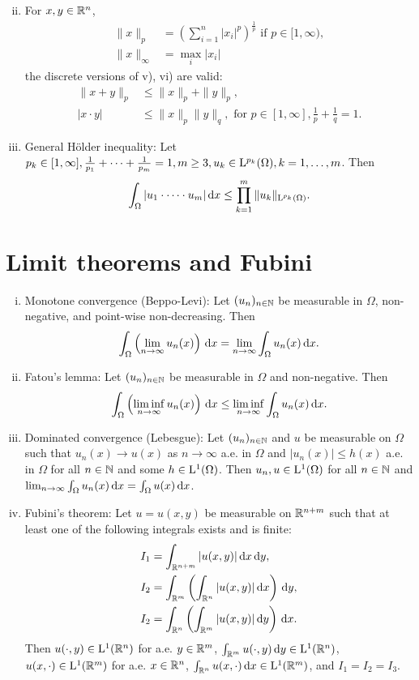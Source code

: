 \begin{enumerate}[i)]
$$    $$
  \item For $x,y \in \mathbb{R}^n$,
    \begin{align*}
      \|x\|_p &= \left( \sum_{i = 1}^n |x_i|^p  \right)^{\frac{1}{p}} \text{ if } p \in [1,\infty), \\
        \|x\|_{\infty} &= \max_{i} |x_i|
    \end{align*}
    the discrete versions of v), vi) are valid:
    \begin{align*}
      \|x + y\|_p &\leq \|x\|_p + \|y\|_p, \\
      |x \cdot y| &\leq \|x\|_p \|y\|_q, \text{ for } p \in [1, \infty], \frac{1}{p} + \frac{1}{q} =1.
    \end{align*}
  \item General Hölder inequality: Let $p_k \in [1,\infty], \frac{1}{p_1} + \cdots+ \frac{1}{p_m} = 1, m \geq 3, u_k \in \mathrm{L}^{p_k}(\Omega), k = 1,\dots,m$.
    Then
    $$
    \int_\Omega |u_1 \cdot \cdots \cdot u_m| \, {\operatorname{d}\!{x}} \leq \prod_{k = 1}^m \|u_k\|_{\mathrm{L}^{p_k}(\Omega)}.
    $$
\end{enumerate}

\section{Limit theorems and Fubini}

\begin{enumerate}[i)]
  \item Monotone convergence (Beppo-Levi): Let $(u_n)_{n \in \mathbb{N}}$ be measurable in $\Omega$, non-negative, and point-wise non-decreasing. Then
    $$
    \int_\Omega \left( \lim_{n \to \infty} u_n(x) \right) \, {\operatorname{d}\!{x}} = \lim_{n \to \infty} \int_\Omega u_n(x) \, {\operatorname{d}\!{x}}.
    $$
  \item Fatou's lemma: Let $(u_n)_{n \in \mathbb{N}}$ be measurable in $\Omega$ and non-negative. Then
    $$
    \int_\Omega \left( \liminf_{n \to \infty} u_n(x) \right) \, {\operatorname{d}\!{x}} 
    \leq \liminf_{n \to \infty} \int_\Omega u_n(x) \, {\operatorname{d}\!{x}}.
    $$
  \item Dominated convergence (Lebesgue): Let $(u_n)_{n \in \mathbb{N}}$ and $u$ be measurable on $\Omega$ such that $u_n(x) \to u(x)$ as $n \to \infty$ a.e. in $\Omega$ and $|u_n(x)| \leq h(x)$ a.e. in $\Omega$ for all $n \in \mathbb{N}$ and some $h \in \mathrm{L}^1(\Omega)$.
    Then $u_n, u \in \mathrm{L}^1(\Omega)$ for all $n \in \mathbb{N}$ and $\lim_{n \to \infty} \int_\Omega u_n(x) \, {\operatorname{d}\!{x}} = \int_\Omega u(x) \, {\operatorname{d}\!{x}}$.
  \item Fubini's theorem: Let $u = u(x,y)$ be measurable on $\mathbb{R}^{n + m}$ such that at least one of the following integrals exists and is finite:
    \begin{align*}
      I_1 &= \int_{\mathbb{R}^{n + m}} |u(x,y)| \, {\operatorname{d}\!{x}} \, {\operatorname{d}\!{y}}, \\
      I_2 &= \int_{\mathbb{R}^m} \left( \int_{\mathbb{R}^n} |u(x,y)| \, {\operatorname{d}\!{x}} \right) \, {\operatorname{d}\!{y}}, \\
      I_2 &= \int_{\mathbb{R}^n} \left( \int_{\mathbb{R}^m} |u(x,y)| \, {\operatorname{d}\!{y}} \right) \, {\operatorname{d}\!{x}}.
    \end{align*}
    Then $u(\cdot,y) \in \mathrm{L}^1(\mathbb{R}^n)$ for a.e. $y \in \mathbb{R}^m$, $\int_{\mathbb{R}^m} u(\cdot,y) \, {\operatorname{d}\!{y}} \in \mathrm{L}^1(\mathbb{R}^n)$, $u(x,\cdot) \in \mathrm{L}^1(\mathbb{R}^m)$ for a.e. $x \in \mathbb{R}^n$, $\int_{\mathbb{R}^n} u(x, \cdot) \, {\operatorname{d}\!{x}} \in \mathrm{L}^1(\mathbb{R}^m)$, and $I_1 = I_2 = I_3$.
\end{enumerate}

